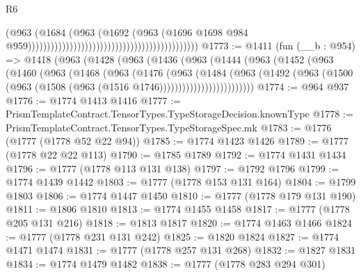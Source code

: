 \begin{lexlean}{R6}
\begin{coremodule}
                                                                                  (@963
                                                                                    (@1684
                                                                                      (@963
                                                                                        (@1692
                                                                                          (@963
                                                                                            (@1696
                                                                                              @1698
                                                                                              @984
                                                                                              @959)))))))))))))))))))))))))))))))))))))))))))))
@1773 := @1411
    (fun (__b : @954) =>
    @1418
      (@963
        (@1428
          (@963
            (@1436
              (@963
                (@1444
                  (@963
                    (@1452
                      (@963
                        (@1460
                          (@963
                            (@1468
                              (@963
                                (@1476
                                  (@963
                                    (@1484
                                      (@963
                                        (@1492
                                          (@963
                                            (@1500
                                              (@963
                                                (@1508 (@963 (@1516 @1746)))))))))))))))))))))))))
@1774 := @964 @937
@1776 := @1774 @1413 @1416
@1777 := PrismTemplateContract.TensorTypes.TypeStorageDecision.knownType
@1778 := PrismTemplateContract.TensorTypes.TypeStorageSpec.mk
@1783 := @1776 (@1777 (@1778 @52 @22 @94))
@1785 := @1774 @1423 @1426
@1789 := @1777 (@1778 @22 @22 @113)
@1790 := @1785 @1789
@1792 := @1774 @1431 @1434
@1796 := @1777 (@1778 @113 @131 @138)
@1797 := @1792 @1796
@1799 := @1774 @1439 @1442
@1803 := @1777 (@1778 @153 @131 @164)
@1804 := @1799 @1803
@1806 := @1774 @1447 @1450
@1810 := @1777 (@1778 @179 @131 @190)
@1811 := @1806 @1810
@1813 := @1774 @1455 @1458
@1817 := @1777 (@1778 @205 @131 @216)
@1818 := @1813 @1817
@1820 := @1774 @1463 @1466
@1824 := @1777 (@1778 @231 @131 @242)
@1825 := @1820 @1824
@1827 := @1774 @1471 @1474
@1831 := @1777 (@1778 @257 @131 @268)
@1832 := @1827 @1831
@1834 := @1774 @1479 @1482
@1838 := @1777 (@1778 @283 @294 @301)

\end{coremodule}
\end{lexlean}
